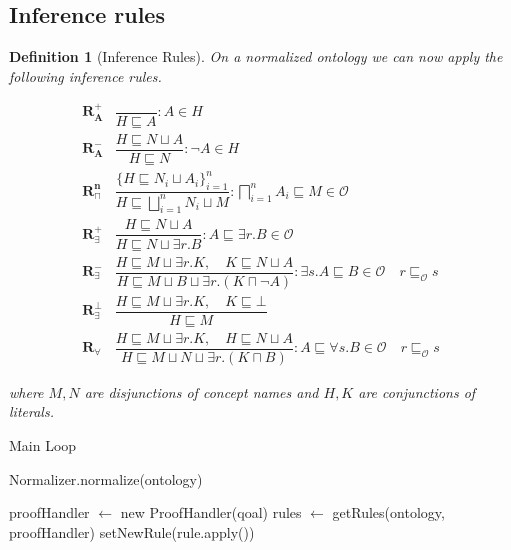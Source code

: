 \documentclass[titlepage]{article}
\newtheorem{definition}{Definition}
\begin{document}
\subsection{Inference rules}
\begin{definition}[Inference Rules]
  On a normalized ontology we can now apply the following inference rules.

\begin{align}
  \mathbf{R^{+}_A} & \dfrac{}{H\sqsubseteq A} : A \in H \label{rules:RPlusA}\\
  \mathbf{R^{-}_A} & \dfrac{H \sqsubseteq N \sqcup A}{H \sqsubseteq N} : \neg A \in H  \label{rules:RMinusA}\\ 
  \mathbf{R^{n}_{\sqcap}} & \dfrac{\{H \sqsubseteq N_i \sqcup A_i \}^{n}_{i=1}}{H \sqsubseteq \bigsqcup^{n}_{i=1} N_i \sqcup M} : \bigsqcap^{n}_{i=1} A_i \sqsubseteq M \in \mathcal{O} \label{rules:RNAnd} \\
  \mathbf{R^+_{\exists}} & \dfrac{H \sqsubseteq N \sqcup A }{ H \sqsubseteq N \sqcup \exists r.B} : A \sqsubseteq \exists r.B \in \mathcal{O} \label{rules:RPlusExists}\\
  \mathbf{R^-_{\exists}} & \dfrac{H \sqsubseteq M \sqcup \exists r.K,\quad K \sqsubseteq N \sqcup A}{H \sqsubseteq M \sqcup B \sqcup \exists r.(K \sqcap \neg A)} : \exists s.A \sqsubseteq B \in \mathcal{O} \quad r \sqsubseteq_{\mathcal{O}} s \label{rules:RMinusExists}\\
  \mathbf{R^\bot_{\exists}} & \dfrac{H \sqsubseteq M \sqcup \exists r.K,\quad K \sqsubseteq \bot}{H \sqsubseteq M} \label{rules:RBotExists}\\
  \mathbf{R_{\forall}} & \dfrac{H \sqsubseteq M \sqcup \exists r.K,\quad H \sqsubseteq N \sqcup A}{H \sqsubseteq M \sqcup N \sqcup \exists r.(K \sqcap B)} : A \sqsubseteq \forall s.B \in \mathcal{O} \quad r \sqsubseteq_{\mathcal{O}} s \label{rules:RForall}
\end{align}

where $M,N$ are disjunctions of concept names and $H,K$ are conjunctions of literals.
\end{definition}

\begin{algorithm}
  \caption{Main Loop}\label{alg:cap}
\begin{algorithmic}
  \State Normalizer.normalize(ontology)

  \State proofHandler $\gets$ new ProofHandler(qoal)
  \State rules $\gets$ getRules(ontology, proofHandler) 
    \State setNewRule(rule.apply())
  \EndFor
  \EndWhile
  \EndProcedure
\end{algorithmic}
\end{algorithm}
\end{document}
